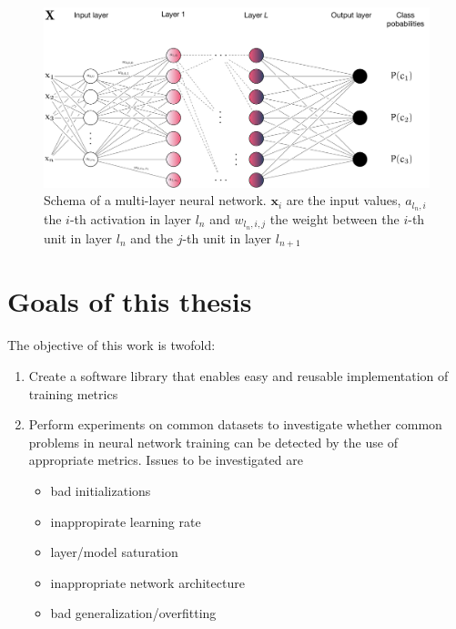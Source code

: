 \begin{figure}
    \hypertarget{fig:neuralnet}{%
        \centering
        \includegraphics[max width=\textwidth]{gfx/diagrams/neural_network/neural_net.pdf}
        \caption[Schema of a multi-layer neural network]{Schema of a multi-layer neural network. \(\mathbf{x}_i\) are
            the input values, \(a_{l_n,i}\) the \(i\)-th activation in layer \(l_n\)
            and \(w_{l_n,i,j}\) the weight between the \(i\)-th unit in layer
        \(l_n\) and the \(j\)-th unit in layer \(l_{n+1}\)}\label{fig:neuralnet}
    }
\end{figure}

\hypertarget{sec:thesis-goals}{%
\section{Goals of this thesis}\label{sec:thesis-goals}}

The objective of this work is twofold:

\begin{enumerate}
    \item
        Create a software library that enables easy and reusable
        implementation of training metrics
    \item
        Perform experiments on common datasets to investigate whether common
        problems in neural network training can be detected by the use of
        appropriate metrics. Issues to be investigated are
        \begin{itemize}
            \item
                bad initializations
            \item
                inappropirate learning rate
            \item
                layer/model saturation
            \item
                inappropriate network architecture
            \item
                bad generalization/overfitting
        \end{itemize}
\end{enumerate}

